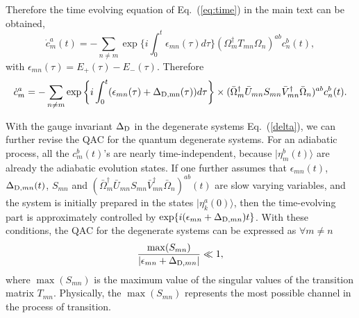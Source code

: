 \documentclass[aps,pra,twocolumn,groupedaddress,10pt]{revtex4}
\def\be{\begin{equation}} \def\ee{\end{equation}}
\begin{document}
\begin{widetext}
\begin{equation}
\end{equation}
Therefore the time evolving equation of Eq.~(\ref{eq:time}) in the main text can be obtained,
\begin{equation}\label{time}
	\dot{c}_{m}^{a}(t) = - \sum_{n\neq m}\exp \{i\int_0^t\epsilon_{mn}(\tau)d\tau\}(\Omega_{m}^{\dag}T_{mn}\Omega_{n})^{ab}c_{n}^{b}(t),
\end{equation}
with $\epsilon_{mn}(\tau) = E_+(\tau) - E_-(\tau)$.
Therefore
\begin{equation}
\dot{c}_{m}^{a} = - \sum_{n\neq m}
\exp \left \{i\int_0^t(\epsilon_{mn}(\tau)+\Delta_{\rm{D},mn}(\tau)) d\tau
\right \}
\times (\bar{\Omega}_m^\dag \bar{U}_{mn}S_{mn}\bar{V}_{mn}^\dag
\bar{\Omega}_n)^{ab}c_{n}^{b}(t).
\end{equation}

With the gauge invariant $\Delta_{{\rm{D}}}$ in the degenerate systems
Eq.~(\ref{delta}), we can further revise the QAC for the quantum
degenerate systems.
For an adiabatic process, all the $c_m^b(t)$'s are nearly time-independent,
because $|\eta_m^b(t)\rangle$ are already the adiabatic evolution states.
If one further assumes that $\epsilon_{mn}(t)$,
$\Delta_{{\rm D},mn}(t)$, $S_{mn}$ and
$(\bar{\Omega}_m^\dag \bar{U}_{mn}S_{mn}\bar{V}_{mn}^\dag \bar{\Omega}_n)^{ab}(t)$
are slow varying variables, and the system is initially prepared
in the states $|\eta^a_{k}(0)\rangle$,
then the time-evolving part is approximately controlled by
$\exp \{i (\epsilon_{mn} + \Delta_{{\rm D},mn} )t \}$.
With these conditions, the QAC for the degenerate systems
can be expressed as $\forall m \neq n$
\be
	\frac{\max(S_{mn})}{|\epsilon_{mn} + \Delta_{{\rm D},mn}|} \ll 1,
\label{adc1}
\ee
where $\max(S_{mn})$ is the maximum value of the singular values of
the transition matrix $T_{mn}$.
Physically, the $\max(S_{mn})$ represents
the most possible channel in the process of transition.


\end{widetext}
\end{document}
